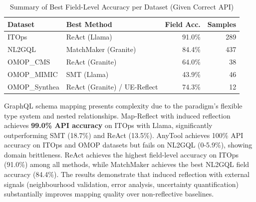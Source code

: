 \documentclass[sigconf, nonacm]{acmart}
\newcommand{\deleted}[1]{\textcolor{red}{#1}}
\begin{document}
  \begin{table}[htbp]
  \centering
  \caption{Summary of Best Field-Level Accuracy per Dataset (Given Correct API)}
  \begin{tabular}{llrr}
  \toprule
  \textbf{Dataset} & \textbf{Best Method} & \textbf{Field Acc.} & \textbf{Samples} \\
  \midrule
  ITOps & ReAct (Llama) & 91.0\% & 289 \\
  NL2GQL & MatchMaker (Granite) & 84.4\% & 437 \\
  OMOP\_CMS & ReAct (Granite) & 64.0\% & 38 \\
  OMOP\_MIMIC & SMT (Llama) & 43.9\% & 46 \\
  OMOP\_Synthea & ReAct (Granite) / UE-Reflect & 74.3\% & 12 \\
  \bottomrule
  \end{tabular}
  \end{table}
  

GraphQL schema mapping presents complexity due to the paradigm's flexible type system and nested relationships. Map-Reflect with induced reflection achieves \textbf{99.0\% API accuracy} on ITOps with Llama, significantly outperforming SMT (18.7\%) and ReAct (13.5\%). AnyTool achieves 100\% API accuracy on ITOps and OMOP datasets but fails on NL2GQL (0-5.9\%), showing domain brittleness. ReAct achieves the highest field-level accuracy on ITOps (91.0\%) among all methods, while MatchMaker achieves the best NL2GQL field accuracy (84.4\%). The results demonstrate that induced reflection with external signals (neighbourhood validation, error analysis, uncertainty quantification) substantially improves mapping quality over non-reflective baselines.

\end{document}
